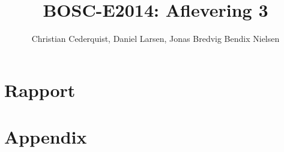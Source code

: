 \documentclass[oneside]{report}
\title{BOSC-E2014: Aflevering 3}
\author{Christian Cederquist, Daniel Larsen, Jonas Bredvig Bendix Nielsen }
\begin{document}
\maketitle
\tableofcontents

\part{Rapport}








\part{Appendix}
\appendix

\end{document}
